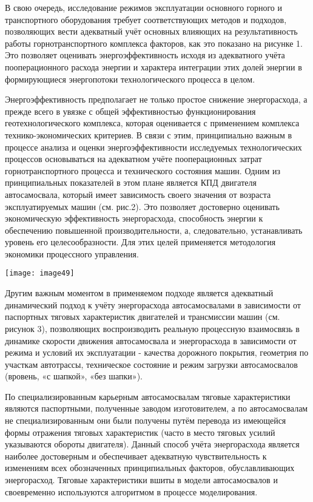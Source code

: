\begin{multicols}{2}

В свою очередь, исследование режимов эксплуатации основного горного и
транспортного оборудования требует соответствующих методов и подходов,
позволяющих вести адекватный учёт основных влияющих на результативность
работы горнотранспортного комплекса факторов, как это показано на
рисунке 1. Это позволяет оценивать энергоэффективность исходя из
адекватного учёта пооперационного расхода энергии и характера интеграции
этих долей энергии в формирующиеся энергопотоки технологического
процесса в целом.

Энергоэффективность предполагает не только простое снижение
энергорасхода, а прежде всего в увязке с общей эффективностью
функционирования геотехнологического комплекса, которая оценивается с
применением комплекса технико-экономических критериев. В связи с этим,
принципиально важным в процессе анализа и оценки энергоэффективности
исследуемых технологических процессов основываться на адекватном учёте
пооперационных затрат горнотранспортного процесса и технического
состояния машин. Одним из принципиальных показателей в этом плане
является КПД двигателя автосамосвала, который имеет зависимость своего
значения от возраста эксплуатируемых машин (см. рис.2). Это позволяет
достоверно оценивать экономическую эффективность энергорасхода,
способность энергии к обеспечению повышенной производительности, а,
следовательно, устанавливать уровень его целесообразности. Для этих
целей применяется методология экономики процессного управления.

{\centering
    \texttt{[image: image49]}
    }

Другим важным моментом в применяемом подходе является адекватный
динамический подход к учёту энергорасхода автосамосвалами в зависимости
от паспортных тяговых характеристик двигателей и трансмиссии машин (см.
рисунок 3), позволяющих воспроизводить реальную процессную взаимосвязь в
динамике скорости движения автосамосвала и энергорасхода в зависимости
от режима и условий их эксплуатации - качества дорожного покрытия,
геометрия по участкам автотрассы, техническое состояние и режим загрузки
автосамосвалов (вровень, «с шапкой», «без шапки»).

По специализированным карьерным автосамосвалам тяговые характеристики
являются паспортными, полученные заводом изготовителем, а по
автосамосвалам не специализированным они были получены путём перевода из
имеющейся формы отражения тяговых характеристик (часто в место тяговых
усилий указываются обороты двигателя). Данный способ учёта энергорасхода
является наиболее достоверным и обеспечивает адекватную чувствительность
к изменениям всех обозначенных принципиальных факторов, обуславливающих
энергорасход. Тяговые характеристики вшиты в модели автосамосвалов и
своевременно используются алгоритмом в процессе моделирования.


\end{multicols}
